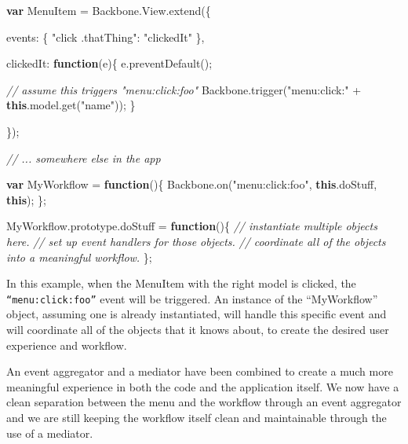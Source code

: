 \documentclass[9pt]{book}
\newenvironment{Shaded}{}{}
\newcommand{\KeywordTok}[1]{\textcolor[rgb]{0.00,0.44,0.13}{\textbf{{#1}}}}
\newcommand{\DataTypeTok}[1]{\textcolor[rgb]{0.56,0.13,0.00}{{#1}}}
\newcommand{\StringTok}[1]{\textcolor[rgb]{0.25,0.44,0.63}{{#1}}}
\newcommand{\CommentTok}[1]{\textcolor[rgb]{0.38,0.63,0.69}{\textit{{#1}}}}
\newcommand{\OtherTok}[1]{\textcolor[rgb]{0.00,0.44,0.13}{{#1}}}
\newcommand{\FunctionTok}[1]{\textcolor[rgb]{0.02,0.16,0.49}{{#1}}}
\newcommand{\NormalTok}[1]{{#1}}
\begin{document}
\begin{Shaded}
\begin{Highlighting}[]
\KeywordTok{var} \NormalTok{MenuItem = }\OtherTok{Backbone}\NormalTok{.}\OtherTok{View}\NormalTok{.}\FunctionTok{extend}\NormalTok{(\{}

  \DataTypeTok{events}\NormalTok{: \{}
    \StringTok{"click .thatThing"}\NormalTok{: }\StringTok{"clickedIt"}
  \NormalTok{\},}

  \DataTypeTok{clickedIt}\NormalTok{: }\KeywordTok{function}\NormalTok{(e)\{}
    \OtherTok{e}\NormalTok{.}\FunctionTok{preventDefault}\NormalTok{();}

    \CommentTok{// assume this triggers "menu:click:foo"}
    \OtherTok{Backbone}\NormalTok{.}\FunctionTok{trigger}\NormalTok{(}\StringTok{"menu:click:"} \NormalTok{+ }\KeywordTok{this}\NormalTok{.}\OtherTok{model}\NormalTok{.}\FunctionTok{get}\NormalTok{(}\StringTok{"name"}\NormalTok{));}
  \NormalTok{\}}

\NormalTok{\});}

\CommentTok{// ... somewhere else in the app}

\KeywordTok{var} \NormalTok{MyWorkflow = }\KeywordTok{function}\NormalTok{()\{}
  \OtherTok{Backbone}\NormalTok{.}\FunctionTok{on}\NormalTok{(}\StringTok{"menu:click:foo"}\NormalTok{, }\KeywordTok{this}\NormalTok{.}\FunctionTok{doStuff}\NormalTok{, }\KeywordTok{this}\NormalTok{);}
\NormalTok{\};}

\OtherTok{MyWorkflow}\NormalTok{.}\OtherTok{prototype}\NormalTok{.}\FunctionTok{doStuff} \NormalTok{= }\KeywordTok{function}\NormalTok{()\{}
  \CommentTok{// instantiate multiple objects here.}
  \CommentTok{// set up event handlers for those objects.}
  \CommentTok{// coordinate all of the objects into a meaningful workflow.}
\NormalTok{\};}
\end{Highlighting}
\end{Shaded}

In this example, when the MenuItem with the right model is clicked, the
\texttt{“menu:click:foo”} event will be triggered. An instance of the
``MyWorkflow'' object, assuming one is already instantiated, will handle
this specific event and will coordinate all of the objects that it knows
about, to create the desired user experience and workflow.

An event aggregator and a mediator have been combined to create a much
more meaningful experience in both the code and the application itself.
We now have a clean separation between the menu and the workflow through
an event aggregator and we are still keeping the workflow itself clean
and maintainable through the use of a mediator.
\end{document}
